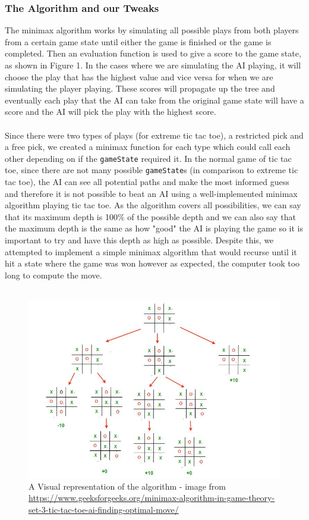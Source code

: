 \documentclass[10pt]{article}
\begin{document}
\subsubsection{The Algorithm and our Tweaks}
The minimax algorithm works by simulating all possible plays from both players from a certain game state until either the game is finished or the game is completed. Then an evaluation function is used to give a score to the game state, as shown in Figure 1. In the cases where we are simulating the AI playing, it will choose the play that has the highest value and vice versa for when we are simulating the player playing. These scores will propagate up the tree and eventually each play that the AI can take from the original game state will have a score and the AI will pick the play with the highest score.
\\\\Since there were two types of plays (for extreme tic tac toe), a restricted pick and a free pick, we created a minimax function for each type which could call each other depending on if the {\tt{gameState}} required it. In the normal game of tic tac toe, since there are not many possible {\tt{gameState}}s (in comparison to extreme tic tac toe), the AI can see all potential paths and make the most informed guess and therefore it is not possible to beat an AI using a well-implemented minimax algorithm playing tic tac toe. As the algorithm covers all possibilities, we can say that its maximum depth is 100\% of the possible depth and we can also say that the maximum depth is the same as how "good" the AI is playing the game so it is important to try and have this depth as high as possible. Despite this, we attempted to implement a simple minimax algorithm that would recurse until it hit a state where the game was won however as expected, the computer took too long to compute the move.
\\\\
\begin{figure}
	\includegraphics[scale = 0.5]{minimax.jpeg}
	\caption{A Visual representation of the algorithm - image from \url{https://www.geeksforgeeks.org/minimax-algorithm-in-game-theory-set-3-tic-tac-toe-ai-finding-optimal-move/}}
\end{figure}
\end{document}
